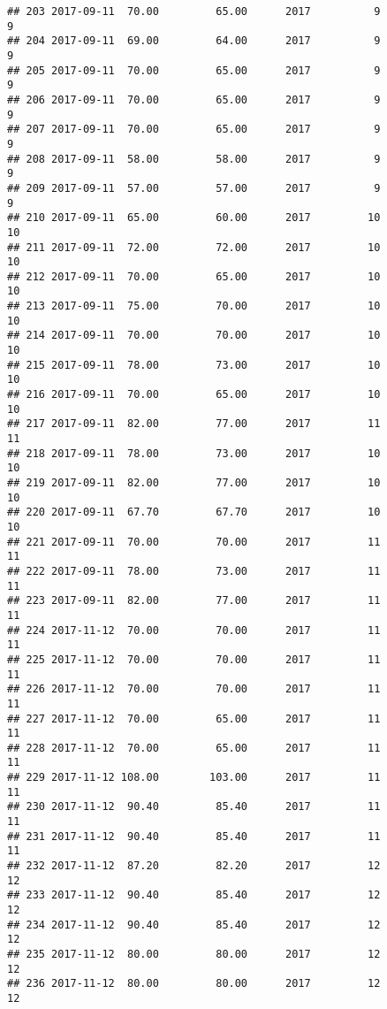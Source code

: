 \documentclass[]{article}
\begin{document}
\begin{verbatim}
## 203 2017-09-11  70.00         65.00      2017          9                 9
## 204 2017-09-11  69.00         64.00      2017          9                 9
## 205 2017-09-11  70.00         65.00      2017          9                 9
## 206 2017-09-11  70.00         65.00      2017          9                 9
## 207 2017-09-11  70.00         65.00      2017          9                 9
## 208 2017-09-11  58.00         58.00      2017          9                 9
## 209 2017-09-11  57.00         57.00      2017          9                 9
## 210 2017-09-11  65.00         60.00      2017         10                10
## 211 2017-09-11  72.00         72.00      2017         10                10
## 212 2017-09-11  70.00         65.00      2017         10                10
## 213 2017-09-11  75.00         70.00      2017         10                10
## 214 2017-09-11  70.00         70.00      2017         10                10
## 215 2017-09-11  78.00         73.00      2017         10                10
## 216 2017-09-11  70.00         65.00      2017         10                10
## 217 2017-09-11  82.00         77.00      2017         11                11
## 218 2017-09-11  78.00         73.00      2017         10                10
## 219 2017-09-11  82.00         77.00      2017         10                10
## 220 2017-09-11  67.70         67.70      2017         10                10
## 221 2017-09-11  70.00         70.00      2017         11                11
## 222 2017-09-11  78.00         73.00      2017         11                11
## 223 2017-09-11  82.00         77.00      2017         11                11
## 224 2017-11-12  70.00         70.00      2017         11                11
## 225 2017-11-12  70.00         70.00      2017         11                11
## 226 2017-11-12  70.00         70.00      2017         11                11
## 227 2017-11-12  70.00         65.00      2017         11                11
## 228 2017-11-12  70.00         65.00      2017         11                11
## 229 2017-11-12 108.00        103.00      2017         11                11
## 230 2017-11-12  90.40         85.40      2017         11                11
## 231 2017-11-12  90.40         85.40      2017         11                11
## 232 2017-11-12  87.20         82.20      2017         12                12
## 233 2017-11-12  90.40         85.40      2017         12                12
## 234 2017-11-12  90.40         85.40      2017         12                12
## 235 2017-11-12  80.00         80.00      2017         12                12
## 236 2017-11-12  80.00         80.00      2017         12                12

\end{verbatim}
\end{document}
